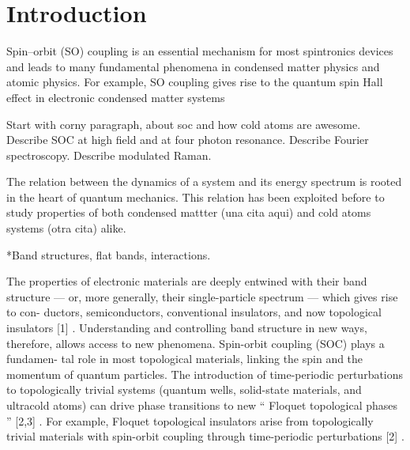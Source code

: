 \section{Introduction}




Spin–orbit (SO) coupling is an essential mechanism for most
spintronics devices and leads to many fundamental phenomena
in condensed matter physics and atomic physics. For example,
SO coupling gives rise to the quantum spin Hall effect in
electronic condensed matter systems

Start with corny paragraph, about soc and how cold atoms are awesome.
Describe SOC at high field and at four photon resonance. Describe Fourier spectroscopy. Describe modulated Raman. 

The relation between the dynamics of a system and its energy spectrum is rooted in the heart of quantum mechanics.  This relation has been exploited before to study properties of both condensed mattter (una cita aqui) and cold atoms systems (otra cita) alike.

*Band structures, flat bands, interactions. 

The  properties  of  electronic  materials  are  deeply
entwined with their band structure
—
or, more generally,
their single-particle spectrum
—
which gives rise to con-
ductors, semiconductors, conventional insulators, and now
topological insulators
[1]
. Understanding and controlling
band structure in new ways, therefore, allows access to new
phenomena. Spin-orbit coupling (SOC) plays a fundamen-
tal role in most topological materials, linking the spin and
the momentum of quantum particles. The introduction of
time-periodic perturbations to topologically trivial systems
(quantum wells, solid-state materials, and ultracold atoms)
can drive phase transitions to new
“
Floquet topological
phases
”
[2,3]
. For example, Floquet topological insulators
arise from topologically trivial materials with spin-orbit
coupling through time-periodic perturbations
[2]
.


